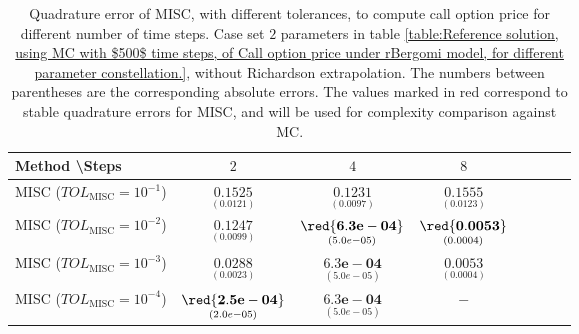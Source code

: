 \begin{table}[h!]
	\centering
	\begin{tabular}{l*{6}{c}r}
		Method \textbackslash  Steps            & $2$ & $4$ & $8$ \\
		\hline
		MISC ($TOL_{\text{MISC}}=10^{-1}$)  & $\underset{(     0.0121)}{\mathbf{
				0.1525}}$ & $\underset{(    0.0097)}{\mathbf{      0.1231
		}}$ & $\underset{( 0.0123
			
			)}{\mathbf{    0.1555}}$   \\
		MISC ($TOL_{\text{MISC}}=10^{-2}$)  & $\underset{(    0.0099
			)}{\mathbf{     0.1247
		}}$ & $\underset{(   5.0e-05)}{\mathbf{\red{  6.3e-04}
		}}$ & $\underset{(0.0004)}{\mathbf{\red{0.0053}}}$  \\
		MISC ($TOL_{\text{MISC}}=10^{-3}$)        & $\underset{(    
			0.0023)}{\mathbf{0.0288}}$  &$\underset{(   5.0e-05)}{\mathbf{  6.3e-04
		}}$ & $\underset{(0.0004)}{\mathbf{0.0053}}$  \\
		MISC ($TOL_{\text{MISC}}=10^{-4}$)        & $\underset{(2.0e-05)}{\mathbf{  \red{ 2.5e-04}}} $ &$\underset{(   5.0e-05)}{\mathbf{ 6.3e-04
		}}$ &  $-$ \\	
		
		\hline
	\end{tabular}
	\caption{Quadrature error of MISC, with different tolerances, to compute call option price  for different number of time steps. Case  set $2$ parameters in table \ref{table:Reference solution, using MC with $500$ time steps, of Call option price under rBergomi model, for different parameter constellation.}, without Richardson extrapolation. The numbers between parentheses are the corresponding absolute errors. The values marked in red correspond to stable quadrature errors for MISC, and will be used for complexity comparison against MC.}
	\label{Quadrature error of MISC to compute Call option price of the different tolerances for different number of time steps. Case  set $2$ parameters, without Richardson extrapolation. The numbers between parentheses are the corresponding absolute errors,linear}
\end{table}


